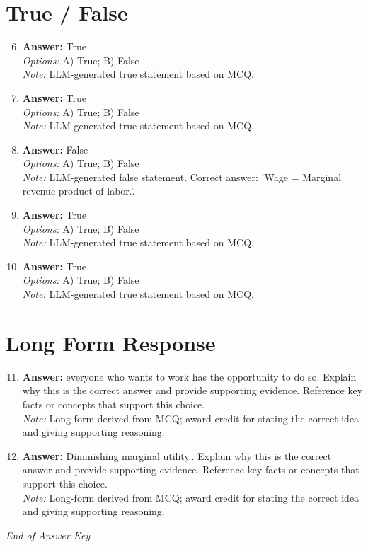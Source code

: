 \documentclass[12pt]{article}
\begin{document}
\section*{True / False}
\begin{enumerate}[label=\arabic*.]
\setcounter{enumi}{5}
\item \textbf{Answer:} True
\\ \textit{Options:} A) True; B) False
\\ \textit{Note:} LLM-generated true statement based on MCQ.
\item \textbf{Answer:} True
\\ \textit{Options:} A) True; B) False
\\ \textit{Note:} LLM-generated true statement based on MCQ.
\item \textbf{Answer:} False
\\ \textit{Options:} A) True; B) False
\\ \textit{Note:} LLM-generated false statement. Correct answer: 'Wage = Marginal revenue product of labor.'.
\item \textbf{Answer:} True
\\ \textit{Options:} A) True; B) False
\\ \textit{Note:} LLM-generated true statement based on MCQ.
\item \textbf{Answer:} True
\\ \textit{Options:} A) True; B) False
\\ \textit{Note:} LLM-generated true statement based on MCQ.
\end{enumerate}

\section*{Long Form Response}
\begin{enumerate}[label=\arabic*.]
\setcounter{enumi}{10}
\item \textbf{Answer:} everyone who wants to work has the opportunity to do so. Explain why this is the correct answer and provide supporting evidence. Reference key facts or concepts that support this choice.
\\ \textit{Note:} Long-form derived from MCQ; award credit for stating the correct idea and giving supporting reasoning.
\item \textbf{Answer:} Diminishing marginal utility.. Explain why this is the correct answer and provide supporting evidence. Reference key facts or concepts that support this choice.
\\ \textit{Note:} Long-form derived from MCQ; award credit for stating the correct idea and giving supporting reasoning.
\end{enumerate}

\vfill
\noindent\textit{End of Answer Key}
\end{document}
